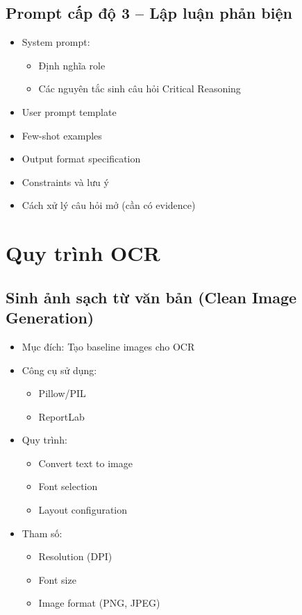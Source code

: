 \subsection{Prompt cấp độ 3 -- Lập luận phản biện}
\begin{itemize}
    \item System prompt:
    \begin{itemize}
        \item Định nghĩa role
        \item Các nguyên tắc sinh câu hỏi Critical Reasoning
    \end{itemize}
    \item User prompt template
    \item Few-shot examples
    \item Output format specification
    \item Constraints và lưu ý
    \item Cách xử lý câu hỏi mở (cần có evidence)
\end{itemize}

\section{Quy trình OCR}

\subsection{Sinh ảnh sạch từ văn bản (Clean Image Generation)}
\begin{itemize}
    \item Mục đích: Tạo baseline images cho OCR
    \item Công cụ sử dụng:
    \begin{itemize}
        \item Pillow/PIL
        \item ReportLab
    \end{itemize}
    \item Quy trình:
    \begin{itemize}
        \item Convert text to image
        \item Font selection
        \item Layout configuration
    \end{itemize}
    \item Tham số:
    \begin{itemize}
        \item Resolution (DPI)
        \item Font size
        \item Image format (PNG, JPEG)
    \end{itemize}
\end{itemize}

